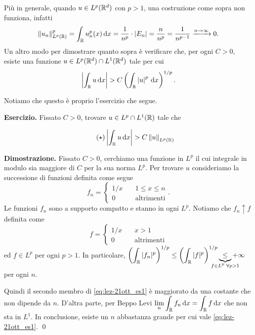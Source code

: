 \begin{enumerate}

Più in generale, quando $u \in L^p(\mathbb R^d)$ con $p > 1$, una costruzione come sopra non funziona, infatti
%
$$
\left\lVert u_n \right\rVert_{L^p(\mathbb R)}^p 
= \int_{\mathbb R} u_n^p(x) \,\mathrm{d} x 
= \frac{1}{n^p} \cdot \left| E_n \right| 
= \frac{n}{n^p} 
= \frac{1}{n^{p-1}} 
\xrightarrow{n \to \infty} 0.
$$
%                    
Un altro modo per dimostrare quanto sopra è verificare che, per ogni $C > 0$, esiste una funzione $u \in L^p(\mathbb R^d) \cap L^1(\mathbb R^d)$ tale per cui 
%
$$
\left| \int_{\mathbb R} u \,\mathrm{d} x  \right| > C \left( \int_{\mathbb R} \left| u \right|^p \,\mathrm{d} x  \right)^{1/p}.
$$
%

Notiamo che questo è proprio l'esercizio che segue.

\end{enumerate}


\textbf{Esercizio.} Fissato $C > 0$, trovare $u \in L^p \cap L^1 (\mathbb R)$ tale che

\begin{equation} \tag{$\star$} \label{eq:lez-21ott_es1}
	\left| \int_{\mathbb R} u \,\mathrm{d} x\right| > C \left\lVert u \right\rVert_{L^p(\mathbb R)}
\end{equation}

\textbf{Dimostrazione.} Fissato $C > 0$, cerchiamo una funzione in $L^p$ il cui integrale in modulo sia maggiore di $C$ per la sua norma $L^p$.
Per trovare $u$ consideriamo la successione di funzioni definita come segue
%
$$
f_n = 
\begin{cases}
1/x \quad & 1 \leq x \leq n \\
0 \quad  & \text{altrimenti} 
\end{cases}. 
$$
%
Le funzioni $f_n$ sono a supporto compatto e stanno in ogni $L^p$.
Notiamo che $f_n \uparrow f$ definita come
%
$$
f = 
\begin{cases}
1/x \quad & x > 1 \\
0 \quad & \text{altrimenti}
\end{cases}
$$
%
ed $f \in L^p$ per ogni $p > 1$.
In particolare, $\ds \left( \int_\R |f_n|^p \right)^{1/p} \leq \left( \int_\R |f|^p \right)^{1/p} \underbrace{\leq}_{\mathclap{f \in L^p \; \forall p > 1}} +\infty$ per ogni $n$.

Quindi il secondo membro di \eqref{eq:lez-21ott_es1} è maggiorato da una costante che non dipende da $n$. D'altra parte, per Beppo Levi $\displaystyle \lim_n \int_{\mathbb R} f_n \,\mathrm{d} x = \int_{\mathbb R} f \,\mathrm{d} x$ che non sta in $L^1$. In conclusione, esiste un $n$ abbastanza grande per cui vale \eqref{eq:lez-21ott_es1}.
\qed

